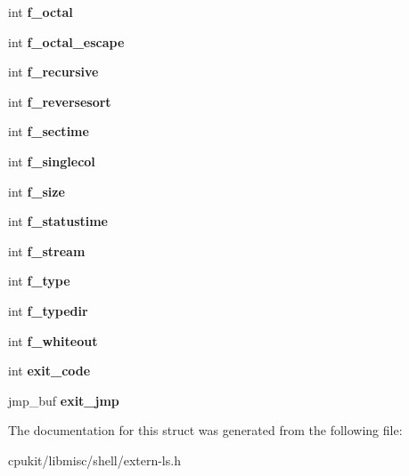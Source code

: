 \begin{DoxyCompactItemize}
int {\bfseries f\+\_\+octal}
\item 
\mbox{\label{structrtems__shell__ls__globals_a543f63fadd2672ac7b89d5ea777995a7}} 
int {\bfseries f\+\_\+octal\+\_\+escape}
\item 
\mbox{\label{structrtems__shell__ls__globals_af604a4bf89e593e26b1ddf6bd52083f7}} 
int {\bfseries f\+\_\+recursive}
\item 
\mbox{\label{structrtems__shell__ls__globals_ab84c8a2ed34dbfa8690443d9103f3e90}} 
int {\bfseries f\+\_\+reversesort}
\item 
\mbox{\label{structrtems__shell__ls__globals_a2b63df71e6c0a05dbdcdbbe70e7cf82a}} 
int {\bfseries f\+\_\+sectime}
\item 
\mbox{\label{structrtems__shell__ls__globals_ae6a4d0c7e54e5b3ce7121a2f0cde8daf}} 
int {\bfseries f\+\_\+singlecol}
\item 
\mbox{\label{structrtems__shell__ls__globals_a983c286efae8bd3ecdff1d62233fcdbe}} 
int {\bfseries f\+\_\+size}
\item 
\mbox{\label{structrtems__shell__ls__globals_a1d94a4b3e9faa4f8120d8931e707f360}} 
int {\bfseries f\+\_\+statustime}
\item 
\mbox{\label{structrtems__shell__ls__globals_a1153acaa8b46408e2d71f915938fff0e}} 
int {\bfseries f\+\_\+stream}
\item 
\mbox{\label{structrtems__shell__ls__globals_aa5231e8fce8aaa3fa257bd6b45dfdea0}} 
int {\bfseries f\+\_\+type}
\item 
\mbox{\label{structrtems__shell__ls__globals_a1508d7b7414de9b3064d10241d93415a}} 
int {\bfseries f\+\_\+typedir}
\item 
\mbox{\label{structrtems__shell__ls__globals_ac9e18a68411759663a5901781a8242f0}} 
int {\bfseries f\+\_\+whiteout}
\item 
\mbox{\label{structrtems__shell__ls__globals_a20f6a9f49340afb18163adf829fcba41}} 
int {\bfseries exit\+\_\+code}
\item 
\mbox{\label{structrtems__shell__ls__globals_acad5750ba3eb387370b0e5fecabceb73}} 
jmp\+\_\+buf {\bfseries exit\+\_\+jmp}
\end{DoxyCompactItemize}


The documentation for this struct was generated from the following file\+:\begin{DoxyCompactItemize}
\item 
cpukit/libmisc/shell/extern-\/ls.\+h\end{DoxyCompactItemize}
